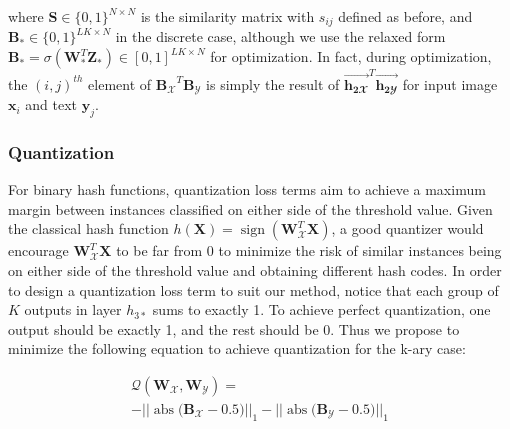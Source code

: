 \documentclass[letterpaper]{article}
\DeclareMathOperator{\sign}{sign}
\DeclareMathOperator{\abs}{abs}
\newcommand{\bpx}{\mathbf{B_\mathcal{X}}}
\newcommand{\bpy}{\mathbf{B_\mathcal{Y}}}
\newcommand{\bps}{\mathbf{B_*}}
\newcommand{\WX}{\mathbf{W}_\mathcal{X}}
\newcommand{\WY}{\mathbf{W}_\mathcal{Y}}
\newcommand{\WS}{\mathbf{W}_*}
\newcommand{\X}{\mathbf{X}}
\newcommand{\Y}{\mathbf{Y}}
\newcommand{\htwoxv}{\vec{\mathbf{h_{2\mathbfcal{X}}}}}
\newcommand{\htwoyv}{\vec{\mathbf{h_{2\mathbfcal{Y}}}}}
\newcommand{\xii}{\mathbf{x}_i}
\newcommand{\yj}{\mathbf{y}_j}
\begin{document}
\noindent where $ \mathbf{S} \in \{0,1\}^{N \times N} $ is the similarity matrix with $ s_{ij} $ defined as before, and $ \bps \in \{0,1\}^{LK \times N} $ in the discrete case, although we use the relaxed form $ \bps = \sigma(\WS^T\mathbf{Z_*}) \in [0,1]^{LK \times N} $ for optimization. In fact, during optimization, the $ (i,j)^{th} $ element of $ \bpx^T \bpy $ is simply the result of $ \htwoxv^T \htwoyv $ for input image $ \xii $ and text $ \yj $.

\subsubsection{Quantization}

For binary hash functions, quantization loss terms aim to achieve a maximum margin between instances classified on either side of the threshold value. Given the classical hash function $ h(\X) = \sign(\WX^T\X) $, a good quantizer would encourage $ \WX^T\X $ to be far from 0 to minimize the risk of similar instances being on either side of the threshold value and obtaining different hash codes. In order to design a quantization loss term to suit our method, notice that each group of $ K $ outputs in layer $ h_{3*} $ sums to exactly 1. To achieve perfect quantization, one output should be exactly 1, and the rest should be 0. Thus we propose to minimize the following equation to achieve quantization for the k-ary case:

\begin{comment}
While earlier quantization algorithms such as \cite{itq,acq} used an alternating iterative optimization procedure, \cite{qch} was the first cross-modal hashing algorithm to perform simultaneous quantization and similarity-preserving optimization. The quantization loss for the binary case is introduced in \cite{itq} and takes the following form for two modalities:
\begin{equation}
\label{eq:binaryQuant}
\left|\left| \mathbf{B}_\mathcal{X} - \WX^T\X \right|\right|^2_F + \left|\left| \mathbf{B}_\mathcal{Y} - \WY^T\Y \right|\right|^2_F
\end{equation}
\end{comment}

\begin{equation}
\label{eq:karyQuant}
\begin{gathered}
\mathcal{Q}(\WX, \WY) = \\
- \Big|\Big| \abs\big( \bpx - 0.5\big) \Big|\Big|_1 - \Big|\Big| \abs\big( \bpy - 0.5\big) \Big|\Big|_1
\end{gathered}
\end{equation}
\end{document}
